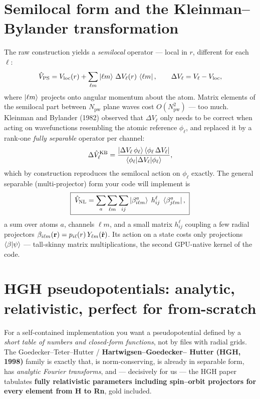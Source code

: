\section{Semilocal form and the Kleinman--Bylander transformation}

The raw construction yields a \emph{semilocal} operator --- local in $r$,
different for each $\ell$:
\begin{equation}
\hat V_{\mathrm{PS}} = V_{\mathrm{loc}}(r)
+ \sum_{\ell m} \ket{\ell m}\, \Delta V_\ell(r)\, \bra{\ell m},
\qquad \Delta V_\ell = V_\ell - V_{\mathrm{loc}},
\end{equation}
where $\ket{\ell m}$ projects onto angular momentum about the atom. Matrix
elements of the semilocal part between $N_{\mathrm{pw}}$ plane waves cost
$O(N_{\mathrm{pw}}^2)$ --- too much. Kleinman and Bylander (1982) observed
that $\Delta V_\ell$ only needs to be correct when acting on wavefunctions
resembling the atomic reference $\phi_\ell$, and replaced it by a rank-one
\emph{fully separable} operator per channel:
\begin{equation}
\Delta \hat V_{\ell}^{\mathrm{KB}} =
\frac{\ket{\Delta V_\ell\, \phi_\ell} \bra{\phi_\ell\, \Delta V_\ell}}
{\braket{\phi_\ell | \Delta V_\ell | \phi_\ell}},
\end{equation}
which by construction reproduces the semilocal action on $\phi_\ell$
exactly. The general separable (multi-projector) form your code will
implement is
\begin{equation}
\boxed{\;
\hat V_{\mathrm{NL}} = \sum_{a}\sum_{\ell m}\sum_{ij}
\ket{\beta^{a}_{i\ell m}}\; h^{\ell}_{ij}\; \bra{\beta^{a}_{j \ell m}},
\;}
\label{eq:separable}
\end{equation}
a sum over atoms $a$, channels $\ell m$, and a small matrix $h^{\ell}_{ij}$
coupling a few radial projectors $\beta_{i\ell m}(\mathbf{r}) = p_{i\ell}(r)\,
Y_{\ell m}(\hat {\mathbf{r}})$. Its action on a state costs only projections
$\braket{\beta | \psi}$ --- tall-skinny matrix multiplications, the second
GPU-native kernel of the code.

\section{HGH pseudopotentials: analytic, relativistic, perfect for \mbox{from-scratch}}
\label{sec:hgh}

For a self-contained implementation you want a pseudopotential defined by a
\emph{short table of numbers and closed-form functions}, not by files with
radial grids. The Goedecker--Teter--Hutter / \textbf{Hartwigsen--Goedecker--%
Hutter (HGH, 1998)} family is exactly that, is norm-conserving, is already in
separable form, has \emph{analytic Fourier transforms}, and --- decisively for
us --- the HGH paper tabulates \textbf{fully relativistic parameters
including spin--orbit projectors for every element from H to Rn}, gold
included.

